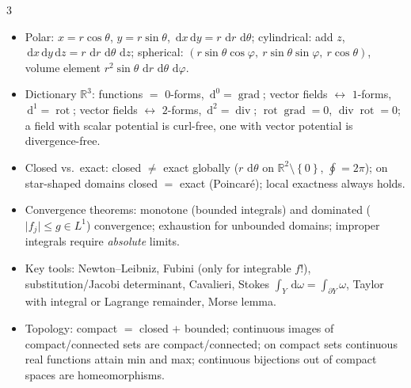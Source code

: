 \documentclass[10pt,a4paper,landscape]{article}
\theoremstyle{definition}
\theoremstyle{plain}
\theoremstyle{remark}
\newcommand{\R}{\mathbb{R}}
\newcommand{\dd}{\,\mathrm{d}}
\newcommand{\abs}[1]{\lvert #1 \rvert}
\newcommand{\set}[1]{\left\{ #1 \right\}}
\DeclareMathOperator{\grad}{grad}
\DeclareMathOperator{\rot}{rot}
\DeclareMathOperator{\Ddiv}{div}
\begin{document}
\begin{multicols*}{3}
\begin{itemize}
\item Polar: $x = r\cos\theta$, $y = r\sin\theta$, $\dd x \dd y = r\,\dd r\, \dd\theta$; cylindrical: add $z$, $\dd x \dd y \dd z = r\, \dd r\, \dd\theta\, \dd z$; spherical: $(r\sin\theta\cos\varphi,\ r\sin\theta\sin\varphi,\ r\cos\theta)$, volume element $r^2\sin\theta\, \dd r\, \dd\theta\, \dd\varphi$.
\item Dictionary $\R^3$: functions $=$ $0$-forms, $\dd^0 = \grad$; vector fields $\leftrightarrow$ $1$-forms, $\dd^1 = \rot$; vector fields $\leftrightarrow$ $2$-forms, $\dd^2 = \Ddiv$; $\rot\grad = 0$, $\Ddiv\rot = 0$; a field with scalar potential is curl-free, one with vector potential is divergence-free.
\item Closed vs.\ exact: closed $\ne$ exact globally ($r\,\dd\theta$ on $\R^2\setminus\set{0}$, $\oint = 2\pi$); on star-shaped domains closed $=$ exact (Poincar\'e); local exactness always holds.
\item Convergence theorems: monotone (bounded integrals) and dominated ($\abs{f_j} \le g \in L^1$) convergence; exhaustion for unbounded domains; improper integrals require \emph{absolute} limits.
\item Key tools: Newton--Leibniz, Fubini (only for integrable $f$!), substitution/Jacobi determinant, Cavalieri, Stokes $\int_Y \dd\omega = \int_{\partial Y}\omega$, Taylor with integral or Lagrange remainder, Morse lemma.
\item Topology: compact $=$ closed $+$ bounded; continuous images of compact/connected sets are compact/connected; on compact sets continuous real functions attain min and max; continuous bijections out of compact spaces are homeomorphisms.
\end{itemize}

\end{multicols*}
\end{document}
